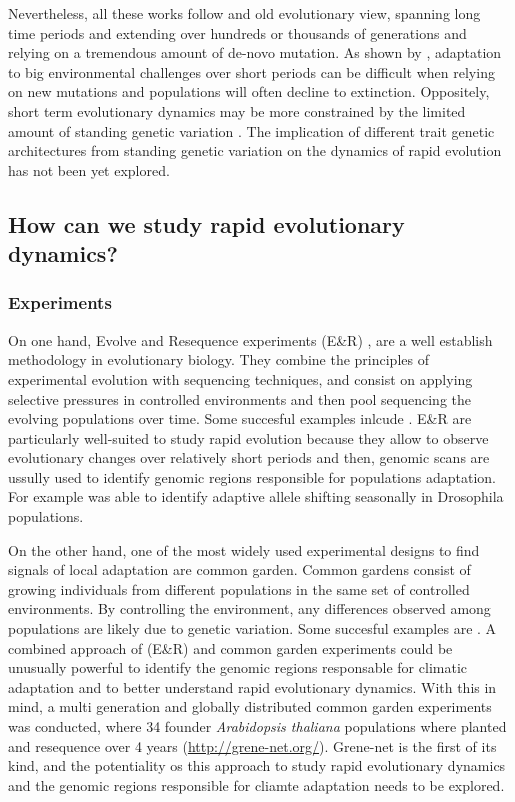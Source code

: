 \documentclass{article}
\begin{document}
Nevertheless, all these works follow and old evolutionary view, spanning long time periods and extending over hundreds or thousands of generations and relying on a tremendous amount of de-novo mutation. As shown by \citep{Orr2008-jl}, adaptation to big environmental challenges over short periods can be difficult when relying on new mutations and populations will often decline to extinction. Oppositely, short term evolutionary dynamics may be more constrained by the limited amount of standing genetic variation \citep{Barrett2008-tj}. The implication of different trait genetic architectures from standing genetic variation on the dynamics of rapid evolution has not been yet explored. 

\subsection{How can we study rapid evolutionary dynamics? }

\subsubsection{Experiments}
On one hand, Evolve and Resequence experiments (E\&R) \citep{Schlotterer2015-yz}, are a well establish methodology in evolutionary biology. They combine the principles of experimental evolution with sequencing techniques, and consist on applying selective pressures in controlled environments and then pool sequencing the evolving populations over time. Some succesful examples inlcude \citep{Bergland2014-ud, Kapun2021-cd, Rudman2022-uc}. E\&R are particularly well-suited to study rapid evolution because they allow to observe evolutionary changes over relatively short periods and then, genomic scans are ussully used to identify genomic regions responsible for populations adaptation. For example \citep{Bergland2014-ud} was able to identify adaptive allele shifting seasonally in Drosophila populations. 

On the other hand, one of the most widely used experimental designs to find signals of local adaptation are common garden. Common gardens consist of growing individuals from different populations in the same set of controlled environments. By controlling the environment, any differences observed among populations are likely due to genetic variation. Some succesful examples are \citep{Exposito-Alonso2019-hs, Lepais2014-za}. A combined approach of (E\&R) and common garden experiments could be unusually powerful to identify the genomic regions responsable for climatic adaptation and to better understand rapid evolutionary dynamics. With this in mind, a multi generation and globally distributed common garden experiments was conducted, where 34 founder \textit{Arabidopsis thaliana} populations where planted and resequence over 4 years (\url{http://grene-net.org/}). Grene-net is the first of its kind, and the potentiality os this approach to study rapid evolutionary dynamics and the genomic regions responsible for cliamte adaptation needs to be explored. 
\end{document}
